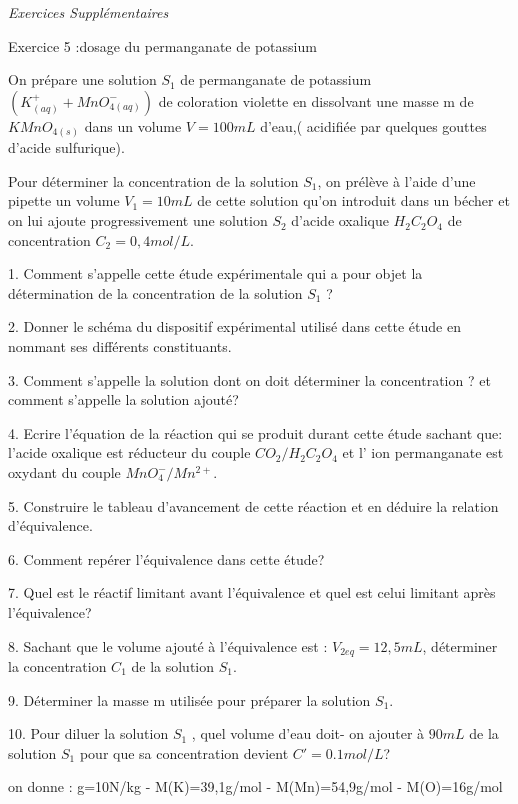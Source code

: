 \documentclass[12pt, french]{article}
\begin{document}
\begin{center}
   \Large{ \em{Exercices Supplémentaires}}
\end{center}


\begin{Box2}{Exercice 5 :dosage du permanganate de potassium }
 
   On prépare une solution $S_1$ de permanganate de potassium $(K^+_{(aq)} + MnO^-_{4 (aq)})$ de coloration violette en dissolvant une
   masse m de $KMnO_{4 (s)}$ dans un volume $V=100mL$ d'eau,( acidifiée par quelques gouttes d'acide sulfurique).

Pour déterminer la concentration de la solution $S_1$, on prélève à l'aide d'une pipette un volume $V_1=10mL$ de cette solution qu'on introduit dans un bécher et on lui ajoute progressivement une solution $S_2$ d'acide oxalique $H_2C_2O_4$ de
concentration $C_2=0,4mol/L$.

1. Comment s'appelle cette étude expérimentale qui a pour objet la détermination de la concentration de la solution $S_1$ ?

2. Donner le schéma du dispositif expérimental utilisé dans cette étude en nommant ses différents constituants.

3. Comment s'appelle la solution dont on doit déterminer la concentration ? et comment s'appelle la solution ajouté?

4. Ecrire l'équation de la réaction qui se produit durant cette étude sachant que:
l'acide oxalique est réducteur du couple $CO_2/H_2C_2O_4$ et l' ion permanganate est oxydant du couple $MnO_4^-/Mn^{2+}$.

5. Construire le tableau d'avancement de cette réaction et en déduire la relation d'équivalence.

6. Comment repérer l'équivalence dans cette étude?

   7. Quel est le réactif limitant avant l'équivalence et quel est celui limitant après l'équivalence?

   8. Sachant que le volume ajouté à l'équivalence est : $V_{2eq}=12,5mL$, déterminer la concentration $C_1$ de la solution $S_1$.

9. Déterminer la masse m utilisée pour préparer la solution $S_1$.

10. Pour diluer la solution $S_1$ , quel volume d'eau doit- on ajouter à $90mL$ de la solution $S_1$ pour que sa concentration devient $ C'=0.1 mol/L $?

on donne : g=10N/kg - M(K)=39,1g/mol - M(Mn)=54,9g/mol - M(O)=16g/mol
\end{Box2}

\end{document}
